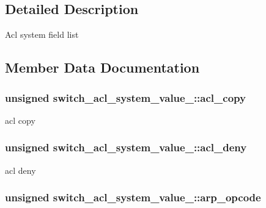 \subsection{Detailed Description}
Acl system field list 

\subsection{Member Data Documentation}
\hypertarget{unionswitch__acl__system__value___aa4c0ea05c81c0463955ff5858a04187f}{
\subsubsection[{acl\+\_\+copy}]{\setlength{\rightskip}{0pt plus 5cm}unsigned switch\+\_\+acl\+\_\+system\+\_\+value\+\_\+\+::acl\+\_\+copy}}\label{unionswitch__acl__system__value___aa4c0ea05c81c0463955ff5858a04187f}
acl copy \hypertarget{unionswitch__acl__system__value___ab329e332db1219f454fb07809eb754f3}{
\subsubsection[{acl\+\_\+deny}]{\setlength{\rightskip}{0pt plus 5cm}unsigned switch\+\_\+acl\+\_\+system\+\_\+value\+\_\+\+::acl\+\_\+deny}}\label{unionswitch__acl__system__value___ab329e332db1219f454fb07809eb754f3}
acl deny \hypertarget{unionswitch__acl__system__value___a9e796157f85034779bc18f47a2d437fc}{
\subsubsection[{arp\+\_\+opcode}]{\setlength{\rightskip}{0pt plus 5cm}unsigned switch\+\_\+acl\+\_\+system\+\_\+value\+\_\+\+::arp\+\_\+opcode}}\label{unionswitch__acl__system__value___a9e796157f85034779bc18f47a2d437fc}
